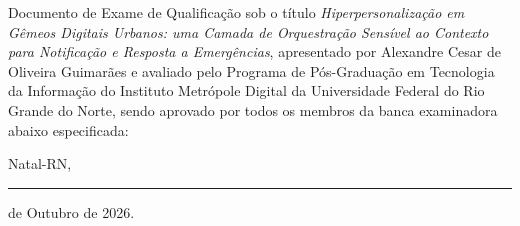 %
\begin{folhadeaprovacao}
	\setlength{\ABNTsignthickness}{0.4pt}
	\setlength{\ABNTsignwidth}{10cm}

	\noindent
	Documento de Exame de Qualificação sob o título \textit{Hiperpersonalização em Gêmeos Digitais Urbanos: uma Camada de Orquestração Sensível ao Contexto para Notificação e Resposta a Emergências}, apresentado por Alexandre Cesar de Oliveira Guimarães e avaliado pelo Programa de Pós-Graduação em Tecnologia da Informação do Instituto Metrópole Digital da Universidade Federal do Rio Grande do Norte, sendo aprovado por todos os membros da banca examinadora abaixo especificada:




	\begin{center}
		Natal-RN, \rule[-0.3ex]{2.5cm}{0.4pt} de Outubro de 2026.
	\end{center}
\end{folhadeaprovacao}
